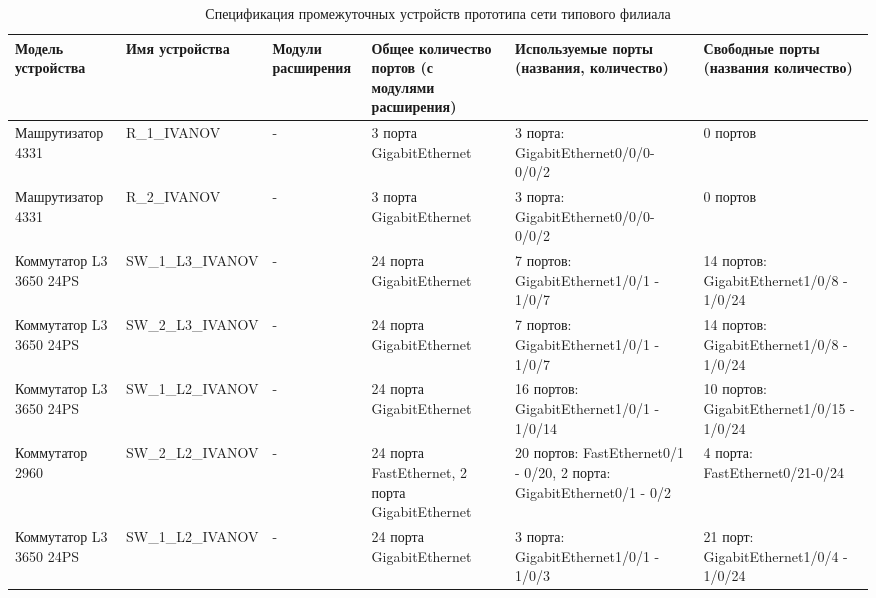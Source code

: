 \documentclass[14pt, a4paper]{extarticle}
\begin{document}
\begin{landscape}\pagestyle{empty}\newpage
\begin{table}[H]
  \caption{Спецификация промежуточных устройств прототипа сети типового филиала\label{tab:filial_device_spec}}
  \centering
  \small
  \begin{tabulary}{\linewidth}{|L|L|L|L|L|L|}
    \hline
        Модель устройства       & Имя устройства                                     & Модули расширения & Общее количество портов (с модулями расширения) & Используемые порты (названия, количество)                            & Свободные порты (названия количество) \\ \hline
        Машрутизатор 4331       & R\allowbreak\_1\allowbreak\_IVANOV                 & -                 & 3 порта GigabitEthernet                         & 3 порта: GigabitEthernet0/0/0-0/0/2                                  & 0 портов \\ \hline
        Машрутизатор 4331       & R\allowbreak\_2\allowbreak\_IVANOV                 & -                 & 3 порта GigabitEthernet                         & 3 порта: GigabitEthernet0/0/0-0/0/2                                  & 0 портов \\ \hline
        Коммутатор L3 3650 24PS & SW\allowbreak\_1\allowbreak\_L3\allowbreak\_IVANOV & -                 & 24 порта GigabitEthernet                        & 7 портов: GigabitEthernet1/0/1 - 1/0/7                               & 14 портов: GigabitEthernet1/0/8 - 1/0/24 \\ \hline
        Коммутатор L3 3650 24PS & SW\allowbreak\_2\allowbreak\_L3\allowbreak\_IVANOV & -                 & 24 порта GigabitEthernet                        & 7 портов: GigabitEthernet1/0/1 - 1/0/7                               & 14 портов: GigabitEthernet1/0/8 - 1/0/24 \\ \hline
        Коммутатор L3 3650 24PS & SW\allowbreak\_1\allowbreak\_L2\allowbreak\_IVANOV & -                 & 24 порта GigabitEthernet                        & 16 портов: GigabitEthernet1/0/1 - 1/0/14                             & 10 портов: GigabitEthernet1/0/15 - 1/0/24 \\ \hline
        Коммутатор 2960         & SW\allowbreak\_2\allowbreak\_L2\allowbreak\_IVANOV & -                 & 24 порта FastEthernet, 2 порта GigabitEthernet  & 20 портов: FastEthernet0/1 - 0/20, 2 порта: GigabitEthernet0/1 - 0/2 & 4 порта: FastEthernet0/21-0/24 \\ \hline
        Коммутатор L3 3650 24PS & SW\allowbreak\_1\allowbreak\_L2\allowbreak\_IVANOV & -                 & 24 порта GigabitEthernet                        & 3 порта: GigabitEthernet1/0/1 - 1/0/3                                & 21 порт: GigabitEthernet1/0/4 - 1/0/24 \\ \hline
  \end{tabulary}
\end{table}
\end{landscape}\pagestyle{plain}\newpage
\end{document}

